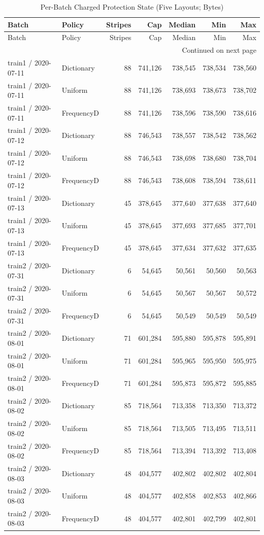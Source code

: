 \begingroup\small\setlength{\tabcolsep}{5pt}
\begin{longtable}{@{}llrrrrr@{}}
\caption{Per-Batch Charged Protection State (Five Layouts; Bytes)}\label{tab:protection}\\
\toprule Batch & Policy & Stripes & Cap & Median & Min & Max\\\midrule\endfirsthead
\toprule Batch & Policy & Stripes & Cap & Median & Min & Max\\\midrule\endhead
\midrule\multicolumn{7}{r}{Continued on next page}\\\endfoot
\bottomrule\endlastfoot
train1 / 2020-07-11 & Dictionary & 88 & 741,126 & 738,545 & 738,534 & 738,560\\
train1 / 2020-07-11 & Uniform & 88 & 741,126 & 738,693 & 738,673 & 738,702\\
train1 / 2020-07-11 & FrequencyD & 88 & 741,126 & 738,596 & 738,590 & 738,616\\
train1 / 2020-07-12 & Dictionary & 88 & 746,543 & 738,557 & 738,542 & 738,562\\
train1 / 2020-07-12 & Uniform & 88 & 746,543 & 738,698 & 738,680 & 738,704\\
train1 / 2020-07-12 & FrequencyD & 88 & 746,543 & 738,608 & 738,594 & 738,611\\
train1 / 2020-07-13 & Dictionary & 45 & 378,645 & 377,640 & 377,638 & 377,640\\
train1 / 2020-07-13 & Uniform & 45 & 378,645 & 377,693 & 377,685 & 377,701\\
train1 / 2020-07-13 & FrequencyD & 45 & 378,645 & 377,634 & 377,632 & 377,635\\
train2 / 2020-07-31 & Dictionary & 6 & 54,645 & 50,561 & 50,560 & 50,563\\
train2 / 2020-07-31 & Uniform & 6 & 54,645 & 50,567 & 50,567 & 50,572\\
train2 / 2020-07-31 & FrequencyD & 6 & 54,645 & 50,549 & 50,549 & 50,549\\
train2 / 2020-08-01 & Dictionary & 71 & 601,284 & 595,880 & 595,878 & 595,891\\
train2 / 2020-08-01 & Uniform & 71 & 601,284 & 595,965 & 595,950 & 595,975\\
train2 / 2020-08-01 & FrequencyD & 71 & 601,284 & 595,873 & 595,872 & 595,885\\
train2 / 2020-08-02 & Dictionary & 85 & 718,564 & 713,358 & 713,350 & 713,372\\
train2 / 2020-08-02 & Uniform & 85 & 718,564 & 713,505 & 713,495 & 713,511\\
train2 / 2020-08-02 & FrequencyD & 85 & 718,564 & 713,394 & 713,392 & 713,408\\
train2 / 2020-08-03 & Dictionary & 48 & 404,577 & 402,802 & 402,802 & 402,804\\
train2 / 2020-08-03 & Uniform & 48 & 404,577 & 402,858 & 402,853 & 402,866\\
train2 / 2020-08-03 & FrequencyD & 48 & 404,577 & 402,801 & 402,799 & 402,801\\
\end{longtable}
\endgroup
